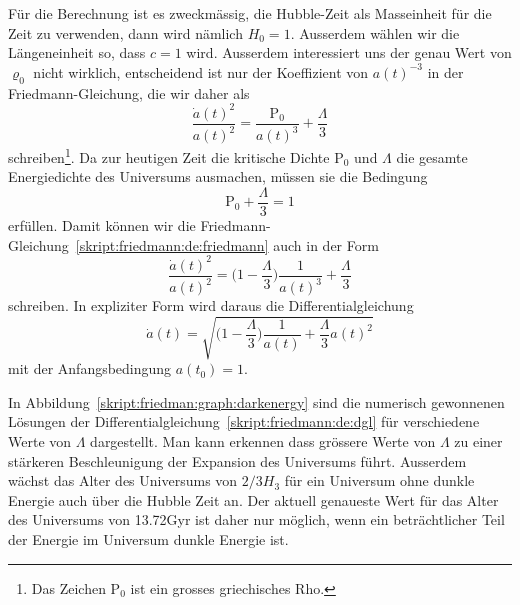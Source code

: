 Für die Berechnung ist es zweckmässig, die Hubble-Zeit als Masseinheit
für die Zeit zu verwenden, dann wird nämlich $H_0=1$.
Ausserdem wählen wir die Längeneinheit so, dass $c=1$ wird.
Ausserdem interessiert uns der genau Wert von $\varrho_0$ nicht wirklich,
entscheidend ist nur der Koeffizient von $a(t)^{-3}$ in der
Friedmann-Gleichung, die wir daher als
\newcommand{\Rho}{\mathrm{P}}
\begin{equation}
\frac{\dot a(t)^2}{a(t)^2}
=
\frac{\Rho_0}{a(t)^3} + \frac{\Lambda}{3}
\label{skript:friedmann:de:friedmann}
\end{equation}
schreiben\footnote{Das Zeichen $\Rho_0$ ist ein grosses griechisches Rho.}.
Da zur heutigen Zeit die kritische Dichte $\Rho_0$ und $\Lambda$ die gesamte
Energiedichte des Universums ausmachen, müssen sie die Bedingung
\begin{equation}
\Rho_0 + \frac{\Lambda}{3}=1
\end{equation}
erfüllen.
Damit können wir die Friedmann-Gleichung~\eqref{skript:friedmann:de:friedmann}
auch in der Form
\begin{equation}
\frac{\dot a(t)^2}{a(t)^2}
=
\biggl(1-\frac{\Lambda}3\biggr)\frac1{a(t)^3} + \frac{\Lambda}3
\label{skript:friedmann:de:simulation}
\end{equation}
schreiben.
In expliziter Form wird daraus die Differentialgleichung
\begin{equation}
\dot a(t)
=
\sqrt{
\biggl(1-\frac{\Lambda}3\biggr)\frac1{a(t)} + \frac{\Lambda}3 a(t)^2
}
\label{skript:friedmann:de:dgl}
\end{equation}
mit der Anfangsbedingung $a(t_0)=1$.

In Abbildung~\ref{skript:friedman:graph:darkenergy} sind die numerisch
gewonnenen Lösungen
der Differentialgleichung~\eqref{skript:friedmann:de:dgl} für verschiedene
Werte von $\Lambda$ dargestellt.
Man kann erkennen dass grössere Werte von $\Lambda$ zu einer stärkeren
Beschleunigung der Expansion des Universums führt.
Ausserdem wächst das Alter des Universums von $2/3H_3$ für ein
Universum ohne dunkle Energie auch über die Hubble Zeit an.
Der aktuell genaueste Wert für das Alter des Universums von 13.72Gyr
ist daher nur möglich, wenn ein beträchtlicher Teil der Energie im
Universum dunkle Energie ist.

